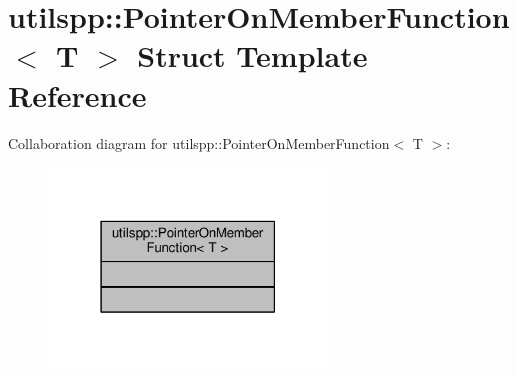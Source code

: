 \hypertarget{structutilspp_1_1PointerOnMemberFunction}{\section{utilspp\-:\-:Pointer\-On\-Member\-Function$<$ T $>$ Struct Template Reference}
\label{structutilspp_1_1PointerOnMemberFunction}
}


Collaboration diagram for utilspp\-:\-:Pointer\-On\-Member\-Function$<$ T $>$\-:
\nopagebreak
\begin{figure}[H]
\begin{center}
\leavevmode
\includegraphics[width=210pt]{structutilspp_1_1PointerOnMemberFunction__coll__graph}
\end{center}
\end{figure}

